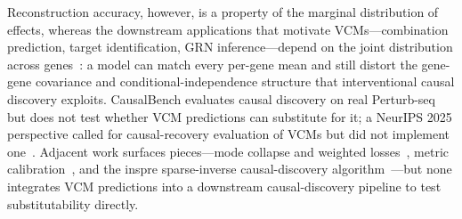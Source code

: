 \documentclass{article}
\theoremstyle{plain}
\theoremstyle{definition}
\theoremstyle{remark}
\begin{document}
Reconstruction accuracy, however, is a property of the marginal distribution of effects, whereas the downstream applications that motivate VCMs---combination prediction, target identification, GRN inference---depend on the joint distribution across genes~\citep{chevalley2025causalbench,vc_causal_2025}: a model can match every per-gene mean and still distort the gene-gene covariance and conditional-independence structure that interventional causal discovery exploits. CausalBench evaluates causal discovery on real Perturb-seq~\citep{chevalley2025causalbench} but does not test whether VCM predictions can substitute for it; a NeurIPS 2025 perspective called for causal-recovery evaluation of VCMs but did not implement one~\citep{vc_causal_2025}. Adjacent work surfaces pieces---mode collapse and weighted losses~\citep{mejia2025diversity}, metric calibration~\citep{miller2025calibrated}, and the inspre sparse-inverse causal-discovery algorithm~\citep{brown2025inspre}---but none integrates VCM predictions into a downstream causal-discovery pipeline to test substitutability directly.
\end{document}
